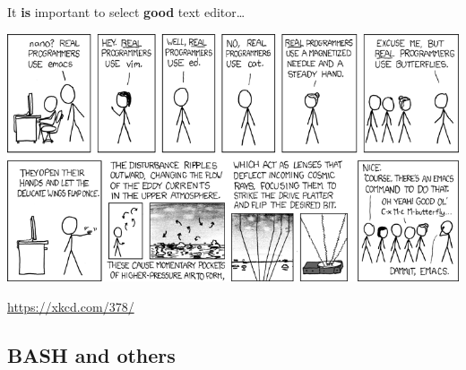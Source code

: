 \documentclass[compress, ucs, xelatex, 11pt, xcolor=svgnames,
  hyperref={
    bookmarks=true,
    unicode=true,
    colorlinks=true,
    pdftitle={Linux, command line and MetaCentrum},
    plainpages=false,
    pdfauthor={Vojtech Zeisek},
    pdfsubject={Course about use of Linux command line, writing shell scripts and using MetaCentrum of CESNET},
    pdfcreator={XeLaTeX},
    pdfkeywords={Linux, GNU, BASH, shell, command line, MetaCentrum},
    linkcolor=Red,
    anchorcolor=Blue,
    citecolor=Purple,
    filecolor=DodgerBlue,
    menucolor=DarkOrchid,
    urlcolor=DeepSkyBlue,
    pdftex},
  url={hyphens, lowtilde} %
  ]{beamer}
\begin{document}
\begin{frame}{It \textbf{is} important to select \textbf{good} text editor\ldots}
  \begin{center}
    \includegraphics[width=\textwidth-1cm]{real_programmers.png}
  \end{center}
  \begin{flushright}
    \url{https://xkcd.com/378/}
  \end{flushright}
\end{frame}

\subsection{BASH and others}
\end{document}

